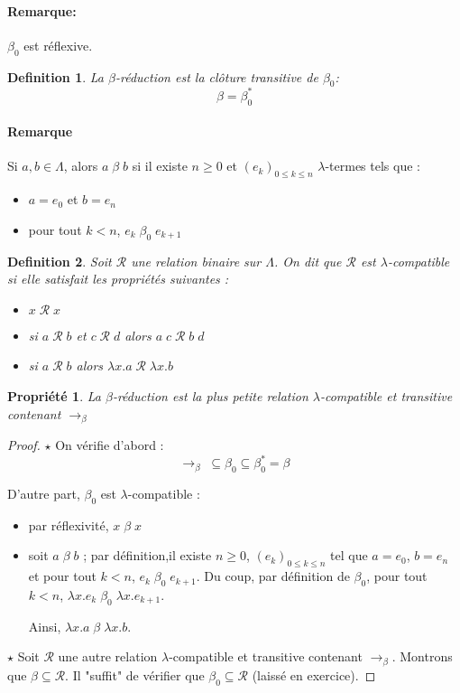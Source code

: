 \documentclass{article}
\newtheorem{prop}{Propriété}
\newtheorem{defi}{Definition}
\newcommand\lterm[2]{\lambda #1. #2}
\begin{document}
\paragraph{Remarque:} $\beta_0$ est réflexive.

\begin{defi}
La \emph{$\beta$-réduction} est la clôture transitive de $\beta_0$:
\[\beta = \beta_0^* \]
\end{defi}


\paragraph{Remarque}
Si $a,b \in \Lambda$, alors $a \; \beta \; b$ si il existe $n\geq 0$ et $(e_k)_{0\leq k \leq n}$ $\lambda$-termes tels que :
\begin{itemize}
\item $a=e_0$ et $b=e_n$
\item pour tout $k<n$, $e_k \; \beta_0 \; e_{k+1}$
\end{itemize}

\begin{defi}
Soit $\mathcal{R}$ une relation binaire sur $\Lambda$. On dit que $\mathcal{R}$ est \emph{$\lambda$-compatible} si elle satisfait les propriétés suivantes :
\begin{itemize}
\item $x\;\mathcal{R}\; x$
\item si $a \; \mathcal{R} \; b$ et $c \;\mathcal{R}\; d$ alors $a\; c\; \mathcal{R} \; b \; d$
\item si $a\; \mathcal{R}\; b$ alors $\lambda x.a\; \mathcal{R}\; \lambda x.b$
\end{itemize}
\end{defi}

\begin{prop}
La $\beta$-réduction est la plus petite relation $\lambda$-compatible et transitive contenant $\to_{\beta}$
\end{prop}

\begin{proof}
$\star$ On vérifie d'abord :
\[\to_\beta \; \subseteq \beta_0 \subseteq \beta_0^* = \beta \]

D'autre part, $\beta_0$ est $\lambda$-compatible :
\begin{itemize}
\item par réflexivité, $x \; \beta	\; x$
\item soit $a\; \beta \; b$ ; par définition,il existe $n\geq 0$, $(e_k)_{0\leq k \leq n}$ tel que $a=e_0$, $b=e_n$ et pour tout $k<n$, $e_k \; \beta_0 \; e_{k+1}$. Du coup, par définition de $\beta_0$, pour tout $k<n$, $\lterm{x}{e_k} \; \beta_0 \; \lterm{x}{e_{k+1}}$.

Ainsi, $\lterm{x}{a} \; \beta \; \lterm{x}{b}$.
\end{itemize}

$\star$ Soit $\mathcal{R}$ une autre relation $\lambda$-compatible et transitive contenant $\to_\beta$. Montrons que $\beta\subseteq \mathcal{R}$. Il "suffit" de vérifier que $\beta_0 \subseteq \mathcal{R}$ (laissé en exercice).
\end{proof}
\end{document}
